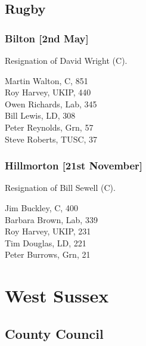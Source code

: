 \documentclass[a4paper,openany,10pt]{book}
\begin{document}
\subsection*{Rugby}

\subsubsection*{Bilton \hspace*{\fill}\nolinebreak[1]%
\enspace\hspace*{\fill}
[2nd May]}


Resignation of David Wright (C).



Martin Walton, C, 851\\
Roy Harvey, UKIP, 440\\
Owen Richards, Lab, 345\\
Bill Lewis, LD, 308\\
Peter Reynolds, Grn, 57\\
Steve Roberts, TUSC, 37\\


\subsubsection*{Hillmorton \hspace*{\fill}\nolinebreak[1]%
\enspace\hspace*{\fill}
[21st November]}


Resignation of Bill Sewell (C).



Jim Buckley, C, 400\\
Barbara Brown, Lab, 339\\
Roy Harvey, UKIP, 231\\
Tim Douglas, LD, 221\\
Peter Burrows, Grn, 21\\


\vfill

\section{West Sussex}

\subsection*{County Council}
\end{document}

